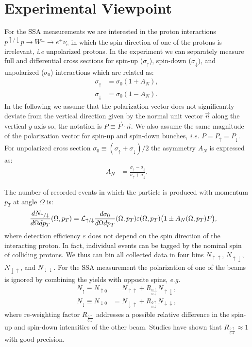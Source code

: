 \documentclass[12pt]{article}
\begin{document}
\section{Experimental Viewpoint}

For the SSA measurements we are interested in the proton interactions
$p^{\uparrow/\downarrow} p \to W^\pm \to e^\pm \nu_e$ in which the spin direction of one
of the protons is irrelevant, \textit{i.e} unpolarized protons. In the
experiment we can separately measure full and differential cross sections for
spin-up ($\sigma_\uparrow$), spin-down ($\sigma_\downarrow$), and unpolarized
($\sigma_0$) interactions which are related as:
%
\begin{align}
\sigma_\uparrow   &= \sigma_0 (1 + A_N ), \\
\sigma_\downarrow &= \sigma_0 (1 - A_N ).
\end{align}
%
In the following we assume that the polarization vector does not significantly
deviate from the vertical direction given by the normal unit vector $\vec n$
along the vertical $y$ axis so, the notation is $P \equiv \vec{P} \cdot
\vec{n}$. We also assume the same magnitude of the polarization vector for
spin-up and spin-down bunches, \textit{i.e.} $P = P_\uparrow = P_\downarrow$.
For unpolarized cross section $\sigma_0 \equiv (\sigma_\uparrow +
\sigma_\downarrow)/2$ the asymmetry $A_N$ is expressed as:
%
\begin{align}
\label{eq_anapower}
A_N &= \frac{\sigma_\uparrow - \sigma_\downarrow}{\sigma_\uparrow +
   \sigma_\downarrow}.
\end{align}

The number of recorded events in which the particle is produced with momentum
$p_T$ at angle $\Omega$ is:
%
\begin{align}
\frac{dN_{\uparrow/\downarrow}}{d\Omega dp_T}(\Omega, p_T) &=
   {\cal L}_{\uparrow/\downarrow} \frac{d\sigma_0}{d\Omega dp_T}(\Omega, p_T)
   \varepsilon(\Omega, p_T) \big( 1 \pm A_N(\Omega, p_T) P \big),
\label{eq:yield_diff}
\end{align}
%
where detection efficiency $\varepsilon$ does not depend on the spin direction
of the interacting proton. In fact, individual events can be tagged by the
nominal spin of colliding protons. We thus can bin all collected data  in four
bins $N_{\uparrow\uparrow}$, $N_{\uparrow\downarrow}$,
$N_{\downarrow\uparrow}$, and $N_{\downarrow\downarrow}$. For the SSA
measurement the polarization of one of the beams is ignored by combining the
yields with opposite spins, \textit{e.g.}
%
\begin{align}
N_{\uparrow}   \equiv N_{\uparrow0}   &= N_{\uparrow\uparrow}   + R_{\frac{0\uparrow}{0\downarrow}} N_{\uparrow\downarrow},\\
N_{\downarrow} \equiv N_{\downarrow0} &= N_{\downarrow\uparrow} + R_{\frac{0\uparrow}{0\downarrow}} N_{\downarrow\downarrow},
\end{align}
%
where re-weighting factor $R_{\frac{0\uparrow}{0\downarrow}}$ addresses a
possible relative difference in the spin-up and spin-down intensities of the
other beam. Studies have shown that $R_{\frac{0\uparrow}{0\downarrow}} \approx
1$ with good precision.
\end{document}
